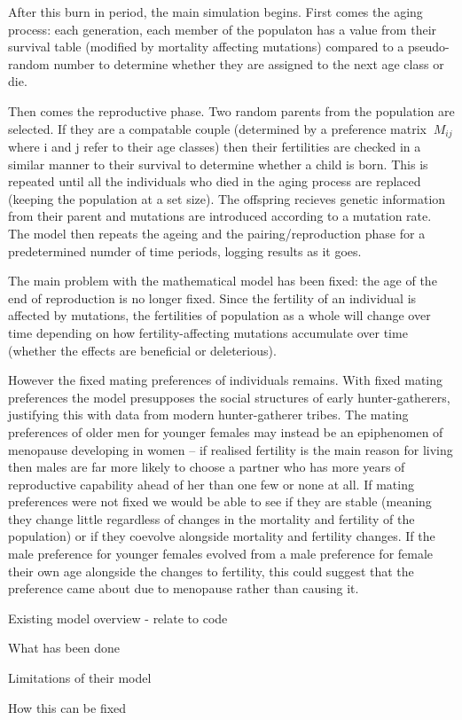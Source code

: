 \documentclass[authoryearcitations]{UoYCSproject}
\begin{document}
After this burn in period, the main simulation begins. First comes the aging process: each generation, each member of the populaton has a value from their survival table (modified by mortality affecting mutations) compared to a pseudo-random number to determine whether they are assigned to the next age class or die.

Then comes the reproductive phase. Two random parents from the population are selected. If they are a compatable couple (determined by a preference matrix $\ M_{ij} $ where i and j refer to their age classes) then their fertilities are checked in a similar manner to their survival to determine whether a child is born. This is repeated until all the individuals who died in the aging process are replaced (keeping the population at a set size). The offspring recieves genetic information from their parent and mutations are introduced according to a mutation rate. The model then repeats the ageing and the pairing/reproduction phase for a predetermined numder of time periods, logging results as it goes.

The main problem with the mathematical model has been fixed: the age of the end of reproduction is no longer fixed. Since the fertility of an individual is affected by mutations, the fertilities of population as a whole will change over time depending on how fertility-affecting mutations accumulate over time (whether the effects are beneficial or deleterious).

However the fixed mating preferences of individuals remains. With fixed mating preferences the model presupposes the social structures of early hunter-gatherers, justifying this with data from modern hunter-gatherer tribes. The mating preferences of older men for younger females may instead be an epiphenomen of menopause developing in women -- if realised fertility is the main reason for living then males are far more likely to choose a partner who has more years of reproductive capability ahead of her than one few or none at all. If mating preferences were not fixed we would be able to see if they are stable (meaning they change little regardless of changes in the mortality and fertility of the population) or if they coevolve alongside mortality and fertility changes. If the male preference for younger females evolved from a male preference for female their own age alongside the changes to fertility, this could suggest that the preference came about due to menopause rather than causing it.

\begin{framed}
Existing model overview - relate to code

What has been done

Limitations of their model

How this can be fixed
\end{framed}
\end{document}
